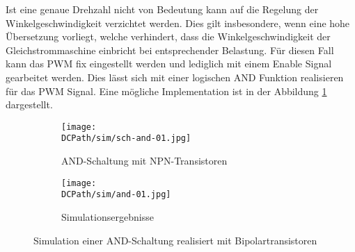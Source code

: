 Ist eine genaue Drehzahl nicht von Bedeutung kann auf die Regelung der
Winkelgeschwindigkeit verzichtet werden. Dies gilt insbesondere, wenn eine
hohe Übersetzung vorliegt, welche verhindert, dass die Winkelgeschwindigkeit
der Gleichstrommaschine einbricht bei entsprechender Belastung. Für diesen
Fall kann das PWM fix eingestellt werden und lediglich mit einem Enable
Signal gearbeitet werden. Dies lässt sich mit einer logischen AND Funktion
realisieren für das PWM Signal. Eine mögliche Implementation ist in der
Abbildung \ref{fig:and} dargestellt.

\begin{figure}[h!]
	\centering
	\begin{subfigure}[b]{0.45\textwidth}
		\texttt{[image: \\DCPath/sim/sch-and-01.jpg]}
		\caption{AND-Schaltung mit NPN-Transistoren}
	\end{subfigure}
	\begin{subfigure}[b]{0.45\textwidth}
		\texttt{[image: \\DCPath/sim/and-01.jpg]}
		\caption{Simulationsergebnisse}
	\end{subfigure}
	\caption{Simulation einer AND-Schaltung realisiert mit
		Bipolartransistoren}
	\label{fig:and}
\end{figure}

